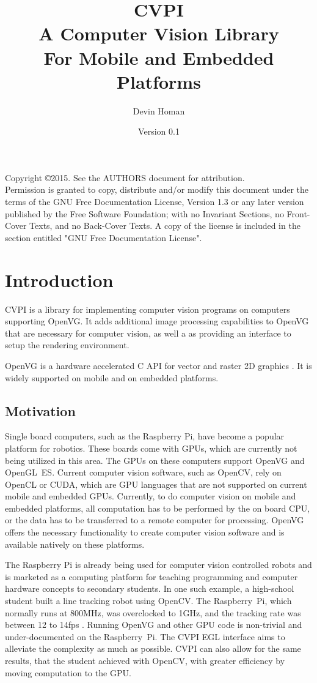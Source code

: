 \documentclass[12pt]{report}
\author{Devin Homan}
\date{Version 0.1}
\title{CVPI\\A Computer Vision Library\\For Mobile and Embedded Platforms}
\begin{document}
\lstset{language=C}

\maketitle
\tableofcontents
\null\vfill
\noindent
Copyright \copyright  2015. See the AUTHORS document for attribution.\\
    Permission is granted to copy, distribute and/or modify this document
    under the terms of the GNU Free Documentation License, Version 1.3
    or any later version published by the Free Software Foundation;
    with no Invariant Sections, no Front-Cover Texts, and no Back-Cover Texts.
    A copy of the license is included in the section entitled "GNU
    Free Documentation License".
\newpage
\chapter{Introduction}
\label{sec-1}
CVPI is a library for implementing computer vision programs on
computers supporting OpenVG. It adds additional image processing
capabilities to OpenVG that are necessary for computer vision, as well
a as providing an interface to setup the rendering environment.

OpenVG is a hardware accelerated C API for vector and raster 2D
graphics \cite{openvg}. It is widely supported on mobile and on
embedded platforms.
\section{Motivation}
\label{sec-1-1}
Single board computers, such as the Raspberry Pi, have become a
popular platform for robotics. These boards come with GPUs, which are
currently not being utilized in this area. The GPUs on these computers
support OpenVG and OpenGL~ES. Current computer vision software, such
as OpenCV, rely on OpenCL or CUDA, which are GPU languages that are
not supported on current mobile and embedded GPUs. Currently, to do
computer vision on mobile and embedded platforms, all computation has
to be performed by the on board CPU, or the data has to be transferred
to a remote computer for processing.  OpenVG offers the necessary
functionality to create computer vision software and is available
natively on these platforms.

The Raspberry Pi is already being used for computer vision controlled
robots and is marketed as a computing platform for teaching
programming and computer hardware concepts to secondary students. In
one such example, a high-school student built a line tracking robot
using OpenCV. The Raspberry~Pi, which normally runs at 800MHz, was
overclocked to 1GHz, and the tracking rate was between 12 to 14fps
\cite{robocup}.  Running OpenVG and other GPU code is non-trivial and
under-documented on the Raspberry~Pi. The CVPI EGL interface aims to
alleviate the complexity as much as possible. CVPI can also allow for
the same results, that the student achieved with OpenCV, with greater
efficiency by moving computation to the GPU.
\end{document}
